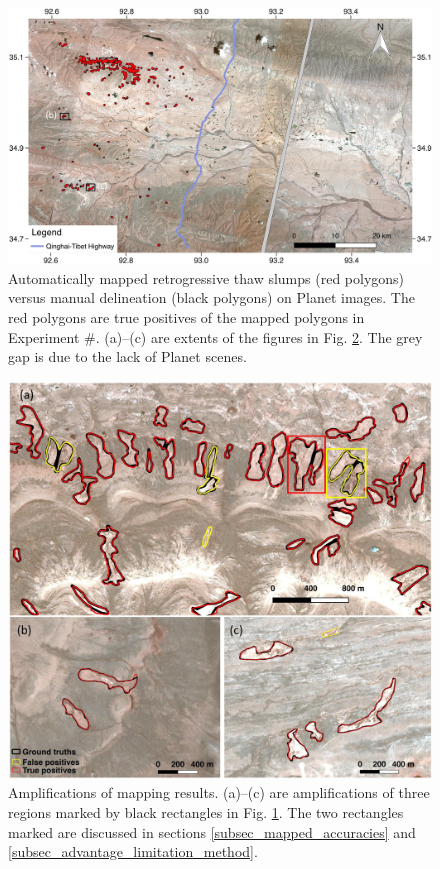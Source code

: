 \documentclass[authoryear,preprint,review,12pt]{elsarticle}
\begin{document}
\begin{figure}
	\centering
	\includegraphics[width=14cm]{figures/whole_area_mapped_trim.jpg}
	\caption{Automatically mapped retrogressive thaw slumps (red polygons) versus manual delineation (black polygons) on Planet images. The red polygons are true positives of the mapped polygons in Experiment \#. (a)--(c) are extents of the figures in Fig. \ref{fig_zoomin_mapped_rts}. The grey gap is due to the lack of Planet scenes.}
	\label{fig_mapped_rts}
\end{figure}

\begin{figure}
	\centering
	\includegraphics[width=12cm]{figures/zoom_in_mapped_polygons_trim.jpg}
	\caption{Amplifications of mapping results. (a)--(c) are amplifications of three regions marked by black rectangles in Fig. \ref{fig_mapped_rts}. The two rectangles marked are discussed in sections \ref{subsec_mapped_accuracies} and \ref{subsec_advantage_limitation_method}.}
	\label{fig_zoomin_mapped_rts}
\end{figure}
\end{document}
